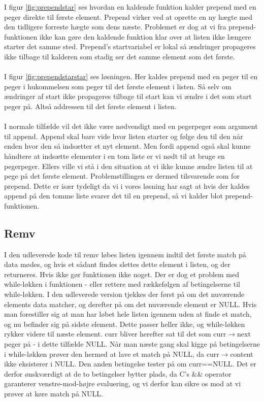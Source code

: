 \documentclass[10pt,a4paper,danish]{article}
\begin{document}
I figur \ref{fig:prependstar} ses hvordan en kaldende funktion kalder prepend med en peger direkte til første element. Prepend virker ved at oprette en ny hægte med den tidligere forreste hægte som dens næste. Problemet er dog at vi fra prepend-funktionen ikke kan gøre den kaldende funktion klar over at listen ikke længere starter det samme sted. Prepend's startvariabel er lokal så ændringer propageres ikke tilbage til kalderen som stadig ser det samme element som det første.\\
\\
I figur \ref{fig:prependstarstar} ses løsningen. Her kaldes prepend med en peger til en peger i hukommelsen som peger til det første element i listen. Så selv om ændringer af start ikke propageres tilbage til start kan vi ændre i det som start peger på. Altså addressen til det første element i listen.\\
\\
I normale tilfælde vil det ikke være nødvendigt med en pegerpeger som argument til append. Append skal bare vide hvor listen starter og følge den til den når enden hvor den så indsætter et nyt element.
Men fordi append også skal kunne håndtere at indsætte elementer i en tom liste er vi nødt til at bruge en pegerpeger. Ellers ville vi stå i den situation at vi ikke kunne ændre listen til at pege på det første element. Problemstillingen er dermed tilsvarende som for prepend. Dette er især tydeligt da vi i vores løsning har sagt at hvis der kaldes append på den tomme liste svarer det til en prepend, så vi kalder blot prepend-funktionen.

\subsection{Remv}
I den udleverede kode til remv løbes listen igennem indtil det første match på data mødes, og hvis et sådant findes slettes dette element i listen, og der returneres. Hvis ikke gør funktionen ikke noget. Der er dog et problem med while-løkken i funktionen - eller rettere med rækkefølgen af betingelserne til while-løkken. I den udleverede version tjekkes der først på om det nuværende elements data matcher, og derefter på om det nuværende element er NULL. Hvis man forestiller sig at man har løbet hele listen igennem uden at finde et match, og nu befinder sig på sidste element. Dette passer heller ikke, og while-løkken rykker videre til næste element. curr bliver herefter sat til det som curr$\rightarrow$next peger på - i dette tilfælde NULL. Når man næste gang skal kigge på betingelserne i while-løkken prøver den hermed at lave et match på NULL, da curr$\rightarrow$content ikke eksisterer i NULL. Den anden betingelse tester på om curr==NULL. Det er derfor ønskværdigt at de to betingelser bytter plads, da C's \&\& operator garanterer venstre-mod-højre evaluering, og vi derfor kan sikre os mod at vi prøver at køre match på NULL.\\
\end{document}
